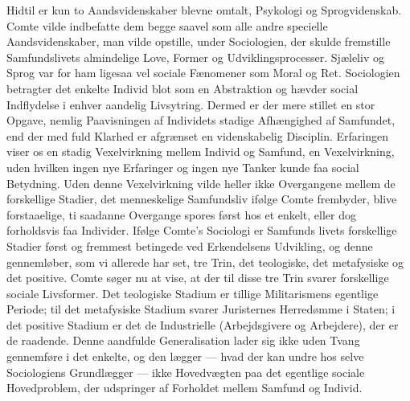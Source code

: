 \documentclass[12pt,a4paper,openany]{book}
\newcommand{\opage}[1]{\marginnote{\footnotesize\textit{[#1]}}}
\begin{document}
Hidtil er kun to Aandsvidenskaber blevne omtalt, Psykologi og
Sprogvidenskab. Comte vilde indbefatte dem begge saavel som alle
andre specielle Aandsvidenskaber, man vilde opstille, under Sociologien,
der skulde fremstille Samfundslivets almindelige Love, Former
og Udviklingsprocesser. Sjæleliv og Sprog var for ham ligesaa vel
sociale Fænomener som Moral og Ret. Sociologien betragter det enkelte
Individ blot som en Abstraktion og hævder social Indflydelse
i enhver aandelig Livsytring. Dermed er der mere stillet en stor Opgave,
nemlig Paavisningen af Individets stadige Afhængighed af
Samfundet, end der med fuld Klarhed er afgrænset en videnskabelig
Disciplin. Erfaringen viser os en stadig Vexelvirkning mellem Individ
og Samfund, en Vexelvirkning, uden hvilken ingen nye Erfaringer og ingen nye Tanker kunde faa social Betydning. Uden denne
Vexelvirkning vilde heller ikke Overgangene mellem de forskellige
Stadier, det menneskelige Samfundsliv ifølge Comte frembyder, blive
forstaaelige, ti saadanne Overgange spores først hos et enkelt, eller
dog forholdsvis faa Individer. Ifølge Comte’s Sociologi er Samfunds%
\opage{56}livets forskellige Stadier først og fremmest betingede ved Erkendelsens
Udvikling, og denne gennemløber, som vi allerede har set, tre
Trin, det teologiske, det metafysiske og det positive. Comte søger nu
at vise, at der til disse tre Trin svarer forskellige sociale Livsformer.
Det teologiske Stadium er tillige Militarismens egentlige Periode; til
det metafysiske Stadium svarer Juristernes Herredømme i Staten;
i det positive Stadium er det de Industrielle (Arbejdsgivere og Arbejdere),
der er de raadende. Denne aandfulde Generalisation lader
sig ikke uden Tvang gennemføre i det enkelte, og den lægger
--- hvad der kan undre hos selve Sociologiens Grundlægger --- ikke
Hovedvægten paa det egentlige sociale Hovedproblem, der udspringer
af Forholdet mellem Samfund og Individ.
\end{document}
